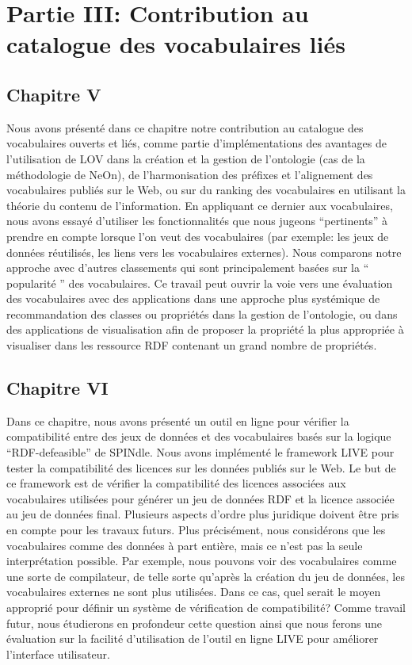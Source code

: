 \documentclass[a4paper,11pt,twoside]{report}
\begin{document}
\chapter*{Partie III: Contribution au catalogue des vocabulaires liés}

\section*{Chapitre V}


Nous avons présenté dans ce chapitre notre contribution au catalogue des vocabulaires ouverts et liés, comme partie d'implémentations des avantages de l'utilisation de LOV dans la création et la gestion de l'ontologie (cas de la méthodologie de NeOn), de l'harmonisation des préfixes et l'alignement des vocabulaires publiés sur le Web, ou sur du ranking des vocabulaires en utilisant la théorie du contenu de l'information. En appliquant ce dernier aux vocabulaires, nous avons essayé d'utiliser les fonctionnalités que nous jugeons ``pertinents''  à prendre en compte lorsque l'on veut des vocabulaires (par exemple: les jeux de données réutilisés, les liens vers les vocabulaires externes). Nous comparons notre approche avec d'autres classements qui sont principalement basées sur la `` popularité '' des vocabulaires. Ce travail peut ouvrir la voie vers une évaluation des vocabulaires avec des applications dans une approche plus systémique de recommandation des classes ou propriétés dans la gestion de l'ontologie, ou dans des applications de visualisation afin de proposer la  propriété la plus appropriée à visualiser dans les ressource RDF contenant un grand nombre de propriétés.

\section*{Chapitre VI}


Dans ce chapitre, nous avons présenté un outil en ligne pour vérifier la compatibilité entre des jeux de données et des vocabulaires basés sur la logique ``RDF-defeasible'' de SPINdle. Nous avons implémenté le framework LIVE pour tester la compatibilité des licences sur les données publiés sur le Web. Le but de ce framework est de vérifier la compatibilité des licences associées aux vocabulaires utilisées pour générer un jeu de données RDF et la licence associée au jeu de données final. Plusieurs aspects d'ordre plus juridique doivent être pris en compte pour les travaux futurs.
Plus précisément, nous considérons que les vocabulaires comme des données à part entière, mais ce n'est pas la seule interprétation possible. Par exemple, nous pouvons voir des vocabulaires comme une sorte de compilateur, de telle sorte qu'après la création du jeu de données, les vocabulaires externes ne sont plus utilisées. Dans ce cas, quel serait le moyen approprié pour définir un système de vérification de compatibilité? Comme travail futur, nous étudierons en profondeur cette question ainsi que nous ferons une évaluation sur la facilité d'utilisation de l'outil en ligne LIVE pour améliorer l'interface utilisateur.
\end{document}
